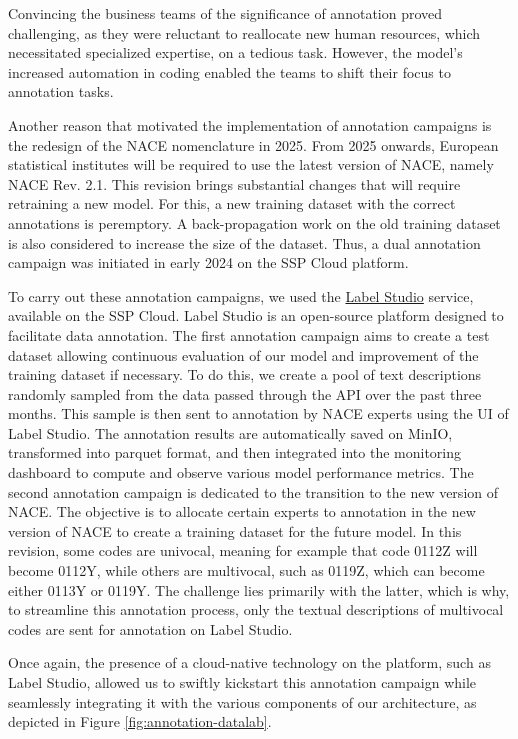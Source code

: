 Convincing the business teams of the significance of annotation proved challenging, as they were reluctant to reallocate new human resources, which necessitated specialized expertise, on a tedious task. However, the model's increased automation in coding enabled the teams to shift their focus to annotation tasks.


Another reason that motivated the implementation of annotation campaigns is the redesign of the NACE nomenclature in 2025. From 2025 onwards, European statistical institutes will be required to use the latest version of NACE, namely NACE Rev. 2.1. This revision brings substantial changes that will require retraining a new model. For this, a new training dataset with the correct annotations is peremptory. A back-propagation work on the old training dataset is also considered to increase the size of the dataset. Thus, a dual annotation campaign was initiated in early 2024 on the SSP Cloud platform.

To carry out these annotation campaigns, we used the \href{https://labelstud.io/}{Label Studio} service, available on the SSP Cloud. Label Studio is an open-source platform designed to facilitate data annotation. The first annotation campaign aims to create a test dataset allowing continuous evaluation of our model and improvement of the training dataset if necessary. To do this, we create a pool of text descriptions randomly sampled from the data passed through the API over the past three months. This sample is then sent to annotation by NACE experts using the UI of Label Studio. The annotation results are automatically saved on MinIO, transformed into parquet format, and then integrated into the monitoring dashboard to compute and observe various model performance metrics. The second annotation campaign is dedicated to the transition to the new version of NACE. The objective is to allocate certain experts to annotation in the new version of NACE to create a training dataset for the future model. In this revision, some codes are univocal, meaning for example that code 0112Z will become 0112Y, while others are multivocal, such as 0119Z, which can become either 0113Y or 0119Y. The challenge lies primarily with the latter, which is why, to streamline this annotation process, only the textual descriptions of multivocal codes are sent for annotation on Label Studio.

Once again, the presence of a cloud-native technology on the platform, such as Label Studio, allowed us to swiftly kickstart this annotation campaign while seamlessly integrating it with the various components of our architecture, as depicted in Figure \ref{fig:annotation-datalab}.

